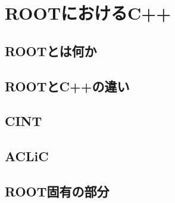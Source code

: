 \chapter{ROOTにおけるC++}
\label{chapter_C++inROOT}

\section{ROOTとは何か}

\section{ROOTとC++の違い}
\section{CINT}

\section{ACLiC}

\section{ROOT固有の部分}